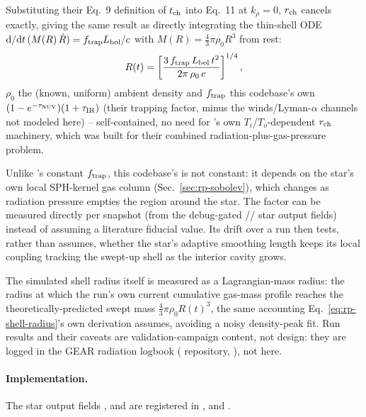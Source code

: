 Substituting their Eq.~9 definition of $t_{\rm ch}$ into Eq.~11 at
$k_\rho=0$, $r_{\rm ch}$ cancels exactly, giving the same result as
directly integrating the thin-shell ODE
$\mathrm{d}/\mathrm{d}t\,(M(R)\,\dot R) = f_{\rm trap}L_{\rm bol}/c$ with
$M(R)=\tfrac{4}{3}\pi\rho_0 R^3$ from rest:
\begin{equation}
  R(t) = \left[\frac{3\,f_{\rm trap}\,L_{\rm bol}\,t^2}
  {2\pi\,\rho_0\,c}\right]^{1/4},
  \label{eq:rp-shell-radius}
\end{equation}
$\rho_0$ the (known, uniform) ambient density and $f_{\rm trap}$ this
codebase's own $(1-e^{-\tau_{\rm NUV}})(1+\tau_{\rm IR})$ (their trapping
factor, minus the winds/Lyman-$\alpha$ channels not modeled here) --
self-contained, no need for \citet{KrumholzMatzner2009}'s own
$T_i$/$T_o$-dependent $r_{\rm ch}$ machinery, which was built for their
combined radiation-plus-gas-pressure problem.

Unlike \citet{KrumholzMatzner2009}'s constant $f_{\rm trap}$, this
codebase's is not constant: it depends on the star's own local
SPH-kernel gas column (Sec.~\ref{sec:rp-sobolev}), which changes as
radiation pressure empties the region around the star. The factor
can be measured directly per snapshot (from the debug-gated
// star output
fields) instead of assuming a
literature fiducial value. Its drift over a run then tests, rather than
assumes, whether the star's adaptive smoothing
length keeps its local coupling tracking the swept-up shell as the
interior cavity grows.

The simulated shell radius itself is measured as a Lagrangian-mass
radius: the radius at which the run's own current cumulative gas-mass
profile reaches the theoretically-predicted swept mass
$\tfrac{4}{3}\pi\rho_0 R(t)^3$, the same accounting
Eq.~\ref{eq:rp-shell-radius}'s own derivation assumes, avoiding a noisy
density-peak fit. Run results and their caveats are validation-campaign
content, not design: they are logged in the GEAR radiation logbook
( repository, ), not here.


\paragraph{Implementation.} The star output fields ,
 and  are registered in
,  and .
